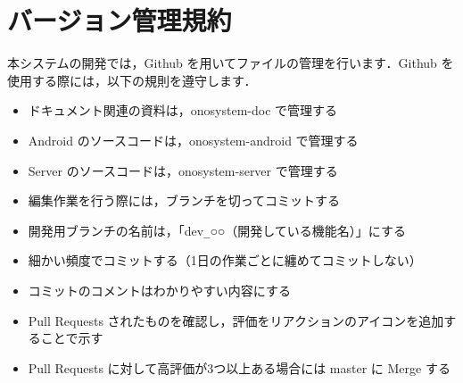 \documentclass[a4j,titlepage]{jarticle}
\begin{document}
\section{バージョン管理規約}
本システムの開発では，Github を用いてファイルの管理を行います．Github を使用する際には，以下の規則を遵守します．
\begin{itemize}
\item ドキュメント関連の資料は，onosystem-doc で管理する
\item Android のソースコードは，onosystem-android で管理する
\item Server のソースコードは，onosystem-server で管理する
\item 編集作業を行う際には，ブランチを切ってコミットする
\item 開発用ブランチの名前は，「dev\verb|_|○○（開発している機能名）」にする
\item 細かい頻度でコミットする（1日の作業ごとに纏めてコミットしない）
\item コミットのコメントはわかりやすい内容にする
\item Pull Requests されたものを確認し，評価をリアクションのアイコンを追加することで示す
\item Pull Requests に対して高評価が3つ以上ある場合には master に Merge する
\end{itemize}
\end{document}
